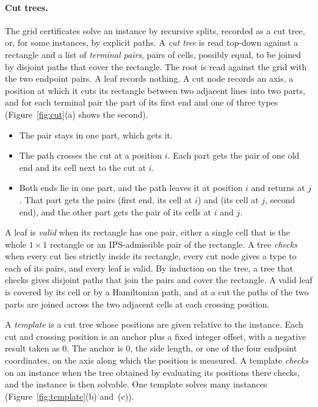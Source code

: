 \documentclass[11pt]{article}
\begin{document}
\paragraph{Cut trees.}\label{lem:cut} The grid certificates solve an instance by
recursive splits, recorded as a cut tree, or, for some instances, by explicit paths. A \emph{cut
tree} is read top-down against a rectangle and a list of \emph{terminal pairs}, pairs of cells, possibly
equal, to be joined by disjoint paths that cover the rectangle. The root is read against the grid with the
two endpoint pairs. A leaf records nothing. A cut node records an axis, a position at which it cuts
its rectangle between two adjacent lines into two parts, and for each terminal pair the part of its
first end and one of three types (Figure~\ref{fig:cut}(a) shows the second).
\begin{itemize}
\item The pair stays in one part, which gets it.
\item The path crosses the cut at a position $i$. Each part gets the pair of one old end and its
  cell next to the cut at $i$.
\item Both ends lie in one part, and the path leaves it at position $i$ and returns at $j$. That
  part gets the pairs (first end, its cell at $i$) and (its cell at $j$, second end), and the other
  part gets the pair of its cells at $i$ and $j$.
\end{itemize}
A leaf is \emph{valid} when its rectangle has one pair, either a single cell that is the whole
$1\times 1$ rectangle or an IPS-admissible pair of the rectangle. A tree \emph{checks} when every
cut lies strictly inside its rectangle, every cut node gives a type to each of its pairs, and every
leaf is valid. By induction on the tree, a tree that checks gives disjoint paths that join the
pairs and cover the rectangle. A valid leaf is covered by its cell or by a Hamiltonian path, and at a cut the paths of the two
parts are joined across the two adjacent cells at each crossing position.

A \emph{template} is a cut tree whose positions are given relative to the instance. Each cut and
crossing position is an anchor plus a fixed integer offset, with a negative result taken as $0$.
The anchor is $0$, the side length, or one of the four endpoint coordinates, on the axis along
which the position is measured. A template \emph{checks} on an instance when the tree obtained by
evaluating its positions there checks, and the instance is then solvable. One template solves many
instances (Figure~\ref{fig:template}(b) and~(c)).
\end{document}
